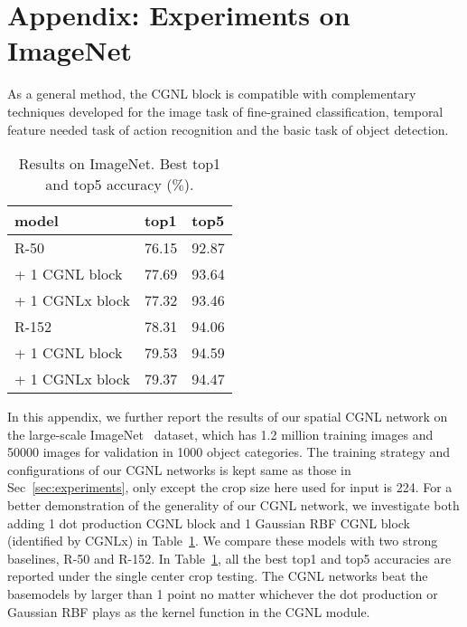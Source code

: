\documentclass{article}
\begin{document}
\section*{Appendix: Experiments on ImageNet}
As a general method, the CGNL block is compatible with complementary techniques developed for the image task of fine-grained classification, temporal feature needed task of action recognition and the basic task of object detection.
% 
% 
\begin{table}[h]
  \caption{Results on ImageNet. Best top1 and top5 accuracy ($\%$).}
  \centering
  \scriptsize
  \begin{tabular}{lll}
    \toprule
    model                 & top1      & top5    \\
    \midrule
    R-50                  & 76.15     & 92.87   \\
    \cmidrule(r){2-3}
    + 1 CGNL block        & 77.69     & 93.64   \\
    + 1 CGNLx block       & 77.32     & 93.46   \\
    \midrule
    R-152                 & 78.31     & 94.06   \\
    \cmidrule(r){2-3}
    + 1 CGNL block        & 79.53     & 94.59   \\
    + 1 CGNLx block       & 79.37     & 94.47   \\
    \bottomrule
  \end{tabular}
  \label{table:imagenet}
\end{table}
% 
% 

In this appendix, we further report the results of our spatial CGNL network on the large-scale ImageNet~\cite{imagenet} dataset, which has 1.2 million training images and 50000 images for validation in 1000 object categories.
The training strategy and configurations of our CGNL networks is kept same as those in Sec~\ref{sec:experiments}, only except the crop size here used for input is 224.
For a better demonstration of the generality of our CGNL network, we investigate both adding 1 dot production CGNL block and 1 Gaussian RBF CGNL block (identified by CGNLx) in Table~\ref{table:imagenet}.
We compare these models with two strong baselines, R-50 and R-152.
In Table~\ref{table:imagenet}, all the best top1 and top5 accuracies are reported under the single center crop testing.
The CGNL networks beat the basemodels by larger than 1 point no matter whichever the dot production or Gaussian RBF plays as the kernel function in the CGNL module.
%
%
\clearpage{\small


}
\end{document}
